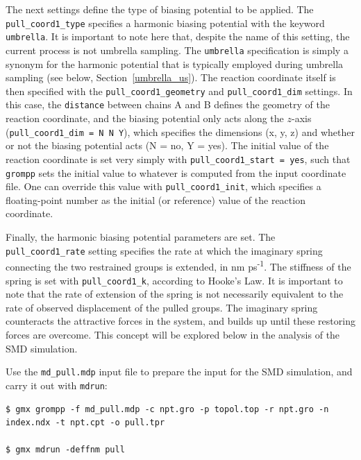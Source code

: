 \documentclass[9pt,tutorial,pubversion]{livecoms}
\begin{document}
The next settings define the type of biasing potential to be applied. The \texttt{pull\_coord1\_type} specifies a harmonic biasing potential with the keyword \texttt{umbrella}. It is important to note here that, despite the name of this setting, the current process is not umbrella sampling. The \texttt{umbrella} specification is simply a synonym for the harmonic potential that is typically employed during umbrella sampling (see below, Section~\ref{umbrella_us}). The reaction coordinate itself is then specified with the \texttt{pull\_coord1\_geometry} and \texttt{pull\_coord1\_dim} settings. In this case, the \texttt{distance} between chains A and B defines the geometry of the reaction coordinate, and the biasing potential only acts along the $z$-axis (\texttt{pull\_coord1\_dim = N N Y}), which specifies the dimensions (x, y, z) and whether or not the biasing potential acts (N = no, Y = yes). The initial value of the reaction coordinate is set very simply with \texttt{pull\_coord1\_start = yes}, such that \texttt{grompp} sets the initial value to whatever is computed from the input coordinate file. One can override this value with \texttt{pull\_coord1\_init}, which specifies a floating-point number as the initial (or reference) value of the reaction coordinate.

Finally, the harmonic biasing potential parameters are set. The \texttt{pull\_coord1\_rate} setting specifies the rate at which the imaginary spring connecting the two restrained groups is extended, in nm ps\textsuperscript{-1}. The stiffness of the spring is set with \texttt{pull\_coord1\_k}, according to Hooke's Law. It is important to note that the rate of extension of the spring is not necessarily equivalent to the rate of observed displacement of the pulled groups. The imaginary spring counteracts the attractive forces in the system, and builds up until these restoring forces are overcome. This concept will be explored below in the analysis of the SMD simulation.

Use the \texttt{md\_pull.mdp} input file to prepare the input for the SMD simulation, and carry it out with \texttt{mdrun}:

\begin{lstlisting}
$ gmx grompp -f md_pull.mdp -c npt.gro -p topol.top -r npt.gro -n index.ndx -t npt.cpt -o pull.tpr

$ gmx mdrun -deffnm pull
\end{lstlisting}
\end{document}
